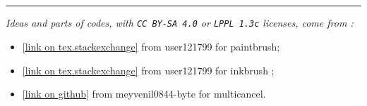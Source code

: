 \documentclass[11pt,a4paper]{ltxdoc}
\begin{document}
\begin{tcolorbox}[colframe=lightgray,colback=lightgray!5]
\hfill{}\hfill~
\end{tcolorbox}

\begin{tcolorbox}[colframe=lightgray,colback=lightgray!5]
\hfill{}
\end{tcolorbox}

\begin{tcolorbox}[colframe=lightgray,colback=lightgray!5]
\hfill{}~~\hfill~
\end{tcolorbox}

\begin{tcolorbox}[colframe=lightgray,colback=lightgray!5]
\hfill{}\hfill~
\end{tcolorbox}

\vfill~

\hrule

\vspace*{5mm}

\textit{Ideas and parts of codes, with \texttt{CC\,BY-SA\,4.0} or \texttt{LPPL 1.3c} licenses, come from :}

\begin{itemize}
  \item \href{https://tex.stackexchange.com/questions/475141/simulating-paintbrush-strokes-in-tikz}{[link on tex.stackexchange]} from \textsf{user121799} for paintbrush;
  \item \href{https://tex.stackexchange.com/questions/460836/custom-line-cap-to-simulate-inked-line-in-tikz/460842#460842}{[link on tex.stackexchange]} from \textsf{user121799} for inkbrush ;
  \item \href{https://github.com/meyvenil0844-byte/-multicancel}{[link on github]} from \textsf{meyvenil0844-byte} for multicancel.
\end{itemize}

\pagebreak


\hypertarget{matoc}{}

\tableofcontents

\vspace*{5mm}

\end{document}
